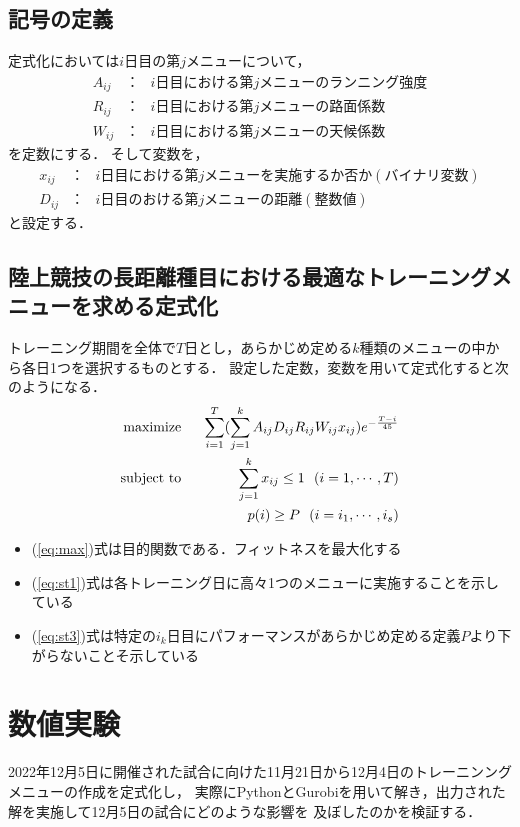 \documentclass[12pt,fleqn]{jreport}
\begin{document}
\section{記号の定義 }
定式化においては$i$日目の第$j$メニューについて，
\begin{eqnarray}
  A_{ij}&：&i日目における第jメニューのランニング強度\nonumber\\
  R_{ij}&：&i日目における第jメニューの路面係数\nonumber\\
  W_{ij}&：&i日目における第jメニューの天候係数\nonumber
\end{eqnarray}
を定数にする．
そして変数を，
\begin{eqnarray}
  x_{ij}&：&i日目における第jメニューを実施するか否か(バイナリ変数)\nonumber\\
  D_{ij}&：&i日目のおける第jメニューの距離(整数値)\nonumber
\end{eqnarray}
と設定する．
\vspace{1cm}
\section{陸上競技の長距離種目における最適なトレーニングメニューを求める定式化}
トレーニング期間を全体で$T$日とし，あらかじめ定める$k$種類のメニューの中から各日1つを選択するものとする．
設定した定数，変数を用いて定式化すると次のようになる．
\vspace{1cm}
\begin{eqnarray}
  \mathop{\rm maximize}&\ \ &\sum_{i=1}^T (\sum_{j=1}^k A_{ij}D_{ij}R_{ij}W_{ij}x_{ij})e^{-\frac{T-i}{45}}\label{eq:max}\\%
  \mathop{\rm subject\ to}&\ \ &\sum_{j=1}^k x_{ij}\leq 1\ \ (i=1,\cdots , T)\label{eq:st1}\\%
  &&p(i)\geq P\ \ (i=i_1,\cdots , i_s)\label{eq:st3}%
\end{eqnarray}
\vspace{2cm}
\begin{itemize}
  \item (\ref{eq:max})式は目的関数である．フィットネスを最大化する
  \item (\ref{eq:st1})式は各トレーニング日に高々1つのメニューに実施することを示している
  \item (\ref{eq:st3})式は特定の$i_k$日目にパフォーマンスがあらかじめ定める定義$P$より下がらないことそ示している
\end{itemize}
\newpage
\chapter {数値実験}
\vspace{1cm}
2022年12月5日に開催された試合に向けた11月21日から12月4日のトレーニンングメニューの作成を定式化し，
実際にPythonとGurobiを用いて解き，出力された解を実施して12月5日の試合にどのような影響を
及ぼしたのかを検証する．
\end{document}
